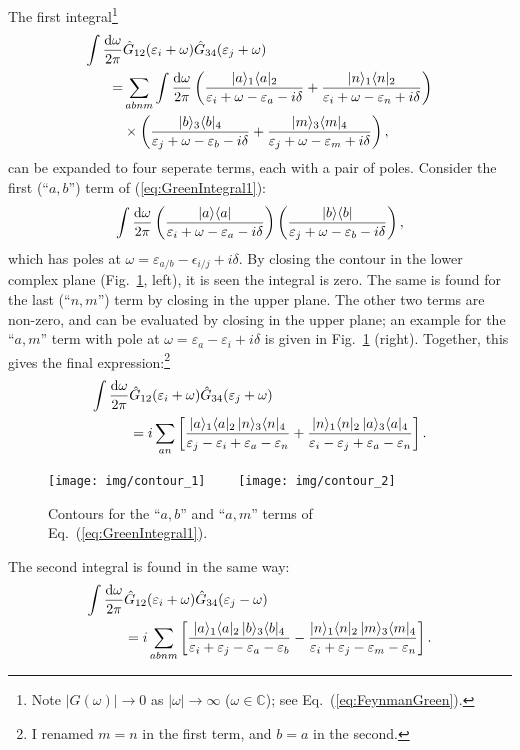 \documentclass[10pt,twocolumn,a4paper]{article}%
\newcommand{\bra}[1]{\ensuremath{\langle #1|}}	%
\newcommand{\ket}[1]{\ensuremath{|#1\rangle}}	%
\newcommand{\be}{\begin{equation}}
\newcommand{\ee}{\end{equation}}
\def\d{\ensuremath{{\rm d}}}
\def\e{\ensuremath{\epsilon}}
\def\en{\ensuremath{\varepsilon}}
\newcommand{\w}{\ensuremath{\omega}}
\begin{document}
The first integral\footnote{Note $|G(\w)|\to0$ as $|\w|\to\infty$ ($\w\in\mathbb{C}$); see Eq.~(\ref{eq:FeynmanGreen}).}
\begin{align}
\int \frac{\d \w}{2\pi}&\hat G_{12}(\en_i+\w) \hat G_{34}(\en_j + \omega)\\
=&\sum_{abnm}\int \frac{\d \w}{2\pi} \left(
\frac{\ket{a}_1\bra{a}_2}{\en_i+\w-\en_a-i\delta} + \frac{\ket{n}_1\bra{n}_2}{\en_i+\w-\en_n+i\delta}
\right)
\notag\\&\times
\left(
\frac{\ket{b}_3\bra{b}_4}{\en_j+\w-\en_b-i\delta} + \frac{\ket{m}_3\bra{m}_4}{\en_j+\w-\en_m+i\delta}
\right),
\label{eq:GreenIntegral1}
\end{align}
can be expanded to four seperate terms, each with a pair of poles.
%
Consider the first (``$a,b$'') term of (\ref{eq:GreenIntegral1}):
\be
\int \frac{\d \w}{2\pi} \left(
\frac{\ket{a}\bra{a}}{\en_i+\w-\en_a-i\delta} 
\right)
\left(
\frac{\ket{b}\bra{b}}{\en_j+\w-\en_b-i\delta} 
\right),
\ee
which has poles at $\w=\en_{a/b}-\e_{i/j}+i\delta$.
By closing the contour in the lower complex plane (Fig.~\ref{fig:contour}, left), it is seen the integral is zero.
The same is found for the last (``$n,m$'') term by closing in the upper plane.
The other two terms are non-zero, and can be evaluated by closing in the upper plane; an example for the ``$a,m$'' term with pole at $\w=\en_a-\en_i+i\delta$ is given in Fig.~\ref{fig:contour} (right).
Together, this gives the final expression:\footnote{I renamed $m=n$ in the first term, and $b=a$ in the second.}
\begin{align}
\int \frac{\d \w}{2\pi}&\hat G_{12}(\en_i+\w) \hat G_{34}(\en_j + \omega)\notag\\
&=
i\sum_{an}\left[
\frac{\ket{a}_1\bra{a}_2 \, \ket{n}_3\bra{n}_4}{\en_j-\en_i+\en_a-\en_n}
+
\frac{\ket{n}_1\bra{n}_2 \, \ket{a}_3\bra{a}_4}{\en_i-\en_j+\en_a-\en_n}
\right].\label{eq:GreenInt1}
\end{align}




\begin{figure}%
\centering
\texttt{[image: img/contour\_1]}~~~~
\texttt{[image: img/contour\_2]}
\caption{\small Contours for the ``$a,b$'' and ``$a,m$'' terms of Eq.~(\ref{eq:GreenIntegral1}).\label{fig:contour}}
\end{figure}

The second integral is found in the same way:
\begin{align}
\int \frac{\d \w}{2\pi}&\hat G_{12}(\en_i+\w) \hat G_{34}(\en_j - \omega)\notag\\
&=
i\sum_{abnm}\left[
\frac{\ket{a}_1\bra{a}_2 \, \ket{b}_3\bra{b}_4}{\en_i+\en_j - \en_a - \en_b}
-
\frac{\ket{n}_1\bra{n}_2 \, \ket{m}_3\bra{m}_4}{\en_i + \en_j - \en_m - \en_n}
\right].
\label{eq:GreenInt2}
\end{align}
\end{document}
